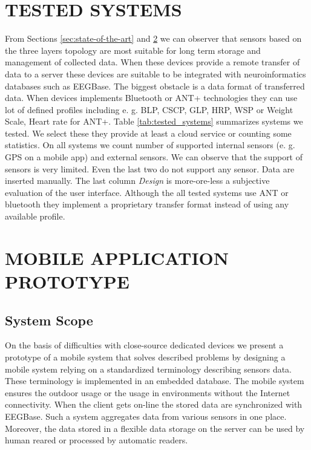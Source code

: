 \documentclass[a4paper,twoside]{article}
\begin{document}
\section{\uppercase{Tested systems}}
\label{tested_systems}
\noindent
From Sections \ref{sec:state-of-the-art} and \ref{mobile_app_prototype} we can observer that sensors based on the three layers topology are most suitable for long term storage and management of collected data. When these devices provide a remote transfer of data to a server these devices are suitable to be integrated with neuroinformatics databases such as EEGBase. The biggest obstacle is a data format of transferred data. When devices implements Bluetooth or ANT+ technologies they can use lot of defined profiles including e. g. BLP, CSCP, GLP, HRP, WSP or Weight Scale, Heart rate for ANT+. Table \ref{tab:tested_systems} summarizes systems we tested. We select these they provide at least a cloud service or counting some statistics. On all systems we count number of supported internal sensors (e. g. GPS on a mobile app) and external sensors. We can observe that the support of sensors is very limited. Even the last two do not support any sensor. Data are inserted manually. The last column \emph{Design} is more-ore-less a subjective evaluation of the user interface. Although the all tested systems use ANT or bluetooth they implement a proprietary transfer format instead of using any available profile. 


\section{\uppercase{Mobile application prototype}}
\label{mobile_app_prototype}


\subsection{System Scope}

On the basis of difficulties with close-source dedicated devices we present a prototype of a mobile system that solves described problems by designing a mobile system relying on a standardized terminology describing sensors data. These terminology is implemented in an embedded database. The mobile system ensures the outdoor usage or the usage in environments without the Internet connectivity. When the client gets on-line the stored data are synchronized with EEGBase. Such a system aggregates data from various sensors in one place. Moreover, the data stored in a flexible data storage on the server can be used by human reared or processed by automatic readers.
\end{document}
